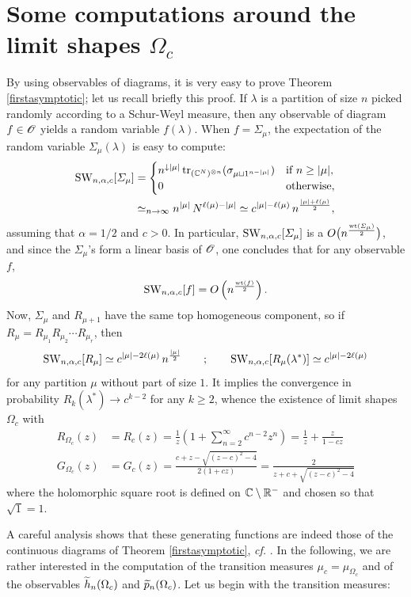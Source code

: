 \documentclass[10pt]{amsart}
\begin{document}
\section{Some computations around the limit shapes $\Omega_{c}$}\label{limitshape}
By using observables of diagrams, it is very easy to prove Theorem \ref{firstasymptotic}; let us recall briefly this proof. If $\lambda$ is a partition of size $n$ picked randomly according to a Schur-Weyl measure, then any observable of diagram $f \in \mathscr{O}$ yields a random variable $f(\lambda)$. When $f=\varSigma_{\mu}$, the expectation of the random variable $\varSigma_{\mu}(\lambda)$ is easy to compute:
\begin{align*}\mathrm{SW}_{n,\alpha,c}[\varSigma_{\mu}]&=\begin{cases}n^{\downarrow |\mu|}\,\mathrm{tr}_{(\mathbb{C}^{N})^{\otimes n}}(\sigma_{\mu\sqcup 1^{n-|\mu|}}) &\text{if }n \geq |\mu|,\\
0&\text{otherwise},
\end{cases}\\
&\simeq_{n \to \infty} n^{|\mu|}\,N^{\ell(\mu)-|\mu|} \simeq c^{|\mu|-\ell(\mu)}\,n^{\frac{|\mu|+\ell(\mu)}{2}},
\end{align*}
assuming that $\alpha=1/2$ and $c>0$. In particular, $\mathrm{SW}_{n,\alpha,c}[\varSigma_{\mu}]$ is a $O\big(n^{\frac{\mathrm{wt}(\varSigma_{\mu})}{2}}\big)$, and since the $\varSigma_{\mu}$'s form a linear basis of $\mathscr{O}$, one concludes that for any observable $f$,
$$\mathrm{SW}_{n,\alpha,c}[f]=O\left(n^{\frac{\mathrm{wt}(f)}{2}}\right).$$
Now, $\varSigma_{\mu}$ and $R_{\mu+1}$ have the same top homogeneous component, so if $R_{\mu}=R_{\mu_{1}}R_{\mu_{2}}\cdots R_{\mu_{r}}$, then
$$\mathrm{SW}_{n,\alpha,c}[R_{\mu}]\simeq c^{|\mu|-2\ell(\mu)}\,n^{\frac{|\mu|}{2}}\qquad;\qquad \mathrm{SW}_{n,\alpha,c}[R_{\mu}(\lambda^{*})] \simeq c^{|\mu|-2\ell(\mu)}$$
for any partition $\mu$ without part of size $1$. It implies the convergence in probability $R_{k}(\lambda^{*}) \to c^{k-2}$ for any $k \geq 2$, whence the existence of limit shapes $\Omega_{c}$ with 
\begin{align*}R_{\Omega_{c}}(z)&=R_{c}(z)=\frac{1}{z}\left(1+\sum_{n=2}^{\infty}c^{n-2}z^{n}\right)=\frac{1}{z}+\frac{z}{1-cz}\\
G_{\Omega_{c}}(z)&=G_{c}(z)=\frac{c+z-\sqrt{(z-c)^{2}-4}}{2(1+cz)}=\frac{2}{z+c+\sqrt{(z-c)^{2}-4}}
\end{align*}
where the holomorphic square root is defined on $\mathbb{C} \setminus \mathbb{R}^{-}$ and chosen so that $\sqrt{1}=1$.
\bigskip

A careful analysis shows that these generating functions are indeed those of the continuous diagrams of Theorem \ref{firstasymptotic}, \emph{cf.} \cite[\S3]{Bia01}. In the following, we are rather interested in the computation of the transition measures $\mu_{c}=\mu_{\Omega_{c}}$ and of the observables $\widetilde{h}_{n}(\Omega_{c})$ and $\widetilde{p}_{n}(\Omega_{c})$. Let us begin with the transition measures:
\end{document}
